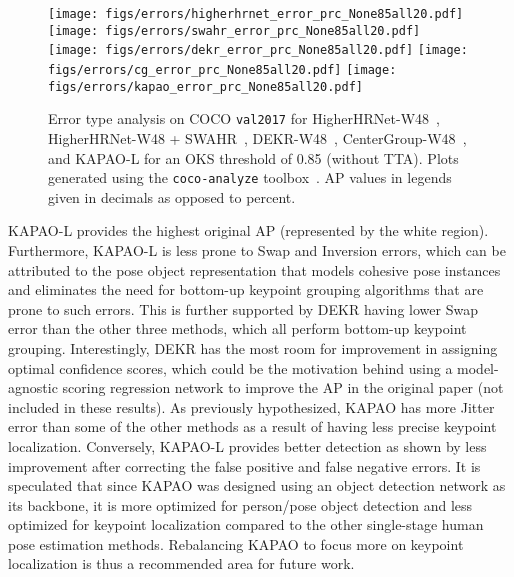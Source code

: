 \documentclass[runningheads]{llncs}
\begin{document}
\begin{figure}[t!]
\centering
    \texttt{[image: figs/errors/higherhrnet\_error\_prc\_None85all20.pdf]}
    \texttt{[image: figs/errors/swahr\_error\_prc\_None85all20.pdf]}
    \texttt{[image: figs/errors/dekr\_error\_prc\_None85all20.pdf]}
    \texttt{[image: figs/errors/cg\_error\_prc\_None85all20.pdf]}
    \texttt{[image: figs/errors/kapao\_error\_prc\_None85all20.pdf]}
\caption[Error type analysis on COCO \texttt{val2017}]{Error type analysis on COCO \texttt{val2017} for HigherHRNet-W48~\cite{cheng2020higherhrnet}, HigherHRNet-W48 + SWAHR~\cite{luo2021rethinking}, DEKR-W48~\cite{geng2021bottom}, CenterGroup-W48~\cite{braso2021center}, and KAPAO-L for an OKS threshold of 0.85 (without TTA). Plots generated using the \texttt{coco-analyze} toolbox~\cite{app_ronchi2017benchmarking}. AP values in legends given in decimals as opposed to percent.}
\label{fig:kapao_errors}
\end{figure}


KAPAO-L provides the highest original AP (represented by the white region). Furthermore, KAPAO-L is less prone to Swap and Inversion errors, which can be attributed to the pose object representation that models cohesive pose instances and eliminates the need for bottom-up keypoint grouping algorithms that are prone to such errors. This is further supported by DEKR having lower Swap error than the other three methods, which all perform bottom-up keypoint grouping. Interestingly, DEKR has the most room for improvement in assigning optimal confidence scores, which could be the motivation behind using a model-agnostic scoring regression network to improve the AP in the original paper (not included in these results). As previously hypothesized, KAPAO has more Jitter error than some of the other methods as a result of having less precise keypoint localization. Conversely, KAPAO-L provides better detection as shown by less improvement after correcting the false positive and false negative errors. It is speculated that since KAPAO was designed using an object detection network as its backbone, it is more optimized for person/pose object detection and less optimized for keypoint localization compared to the other single-stage human pose estimation methods. Rebalancing KAPAO to focus more on keypoint localization is thus a recommended area for future work.
\end{document}
